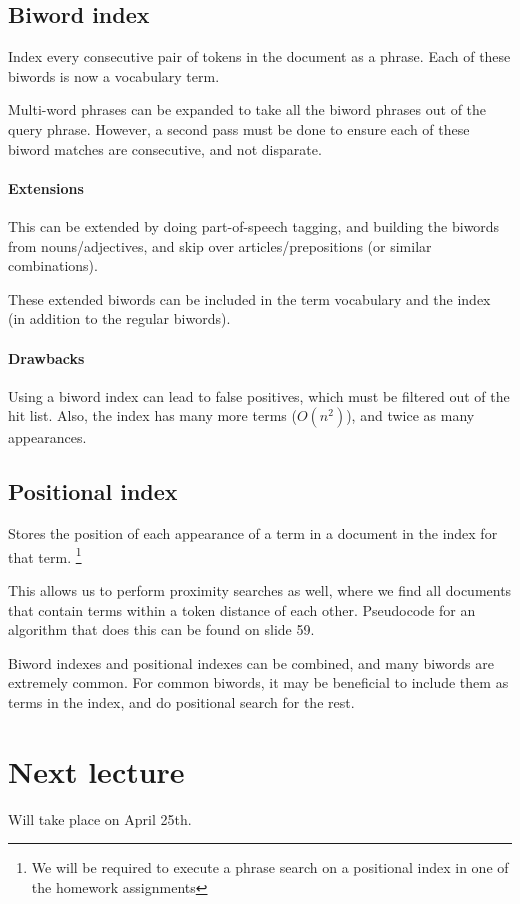 \documentclass{idc_msc}
\begin{document}
\subsection{Biword index}

Index every consecutive pair of tokens in the document as a phrase.
Each of these biwords is now a vocabulary term.

Multi-word phrases can be expanded to take all the biword phrases out of the query phrase.
However, a second pass must be done to ensure each of these biword matches are consecutive, and not disparate.

\paragraph{Extensions}

This can be extended by doing part-of-speech tagging, and building the biwords from nouns/adjectives, and skip over articles/prepositions (or similar combinations).

These extended biwords can be included in the term vocabulary and the index (in addition to the regular biwords).

\paragraph{Drawbacks}

Using a biword index can lead to false positives, which must be filtered out of the hit list.
Also, the index has many more terms (\(O(n^2)\)), and twice as many appearances.

\subsection{Positional index}

Stores the position of each appearance of a term in a document in the index for that term.
\footnote{We will be required to execute a phrase search on a positional index in one of the homework assignments}

This allows us to perform proximity searches as well, where we find all documents that contain terms within a token distance of each other.
Pseudocode for an algorithm that does this can be found on slide 59.

Biword indexes and positional indexes can be combined, and many biwords are extremely common.
For common biwords, it may be beneficial to include them as terms in the index, and do positional search for the rest.

\section{Next lecture}

Will take place on April 25th.
\end{document}
